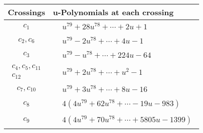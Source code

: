 \documentclass[1p]{elsarticle_modified}
\theoremstyle{definition}
\begin{document}
\begin{tabular}{m{50pt}|m{274pt}}
Crossings & \hspace{64pt}u-Polynomials at each crossing \\
\hline $$\begin{aligned}c_{1}\end{aligned}$$&$\begin{aligned}
&u^{79}+28 u^{78}+\cdots+2 u+1
\end{aligned}$\\
\hline $$\begin{aligned}c_{2},c_{6}\end{aligned}$$&$\begin{aligned}
&u^{79}-2 u^{78}+\cdots+4 u-1
\end{aligned}$\\
\hline $$\begin{aligned}c_{3}\end{aligned}$$&$\begin{aligned}
&u^{79}- u^{78}+\cdots+224 u-64
\end{aligned}$\\
\hline $$\begin{aligned}c_{4},c_{5},c_{11}\\c_{12}\end{aligned}$$&$\begin{aligned}
&u^{79}+2 u^{78}+\cdots+u^2-1
\end{aligned}$\\
\hline $$\begin{aligned}c_{7},c_{10}\end{aligned}$$&$\begin{aligned}
&u^{79}+3 u^{78}+\cdots+8 u-16
\end{aligned}$\\
\hline $$\begin{aligned}c_{8}\end{aligned}$$&$\begin{aligned}
&4(4 u^{79}+62 u^{78}+\cdots-19 u-983)
\end{aligned}$\\
\hline $$\begin{aligned}c_{9}\end{aligned}$$&$\begin{aligned}
&4(4 u^{79}+70 u^{78}+\cdots+5805 u-1399)
\end{aligned}$\\
\hline
\end{tabular}\\~\\
\end{document}
